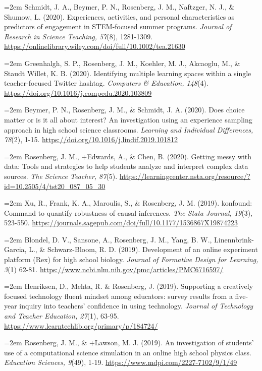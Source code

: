 \documentclass[
  14,
]{article}
\begin{document}
\hangindent=2em Schmidt, J. A., Beymer, P. N., Rosenberg, J. M.,
Naftzger, N. J., \& Shumow, L. (2020). Experiences, activities, and
personal characteristics as predictors of engagement in STEM-focused
summer programs. \emph{Journal of Research in Science Teaching, 57}(8),
1281-1309.
\url{https://onlinelibrary.wiley.com/doi/full/10.1002/tea.21630}

\hangindent=2em Greenhalgh, S. P., Rosenberg, J. M., Koehler, M. J.,
Akcaoglu, M., \& Staudt Willet, K. B. (2020). Identifying multiple
learning spaces within a single teacher-focused Twitter hashtag.
\emph{Computers \& Education, 148}(4).
\url{https://doi.org/10.1016/j.compedu.2020.103809}

\hangindent=2em Beymer, P. N., Rosenberg, J. M., \& Schmidt, J. A.
(2020). Does choice matter or is it all about interest? An investigation
using an experience sampling approach in high school science classrooms.
\emph{Learning and Individual Differences, 78}(2), 1-15.
\url{https://doi.org/10.1016/j.lindif.2019.101812}

\hangindent=2em Rosenberg, J. M., +Edwards, A., \& Chen, B. (2020).
Getting messy with data: Tools and strategies to help students analyze
and interpret complex data sources. \emph{The Science Teacher, 87}(5).
\url{https://learningcenter.nsta.org/resource/?id=10.2505/4/tst20_087_05_30}

\hangindent=2em Xu, R., Frank, K. A., Maroulis, S., \& Rosenberg, J. M.
(2019). konfound: Command to quantify robustness of causal inferences.
\emph{The Stata Journal, 19}(3), 523-550.
\url{https://journals.sagepub.com/doi/full/10.1177/1536867X19874223}

\hangindent=2em Blondel, D. V., Sansone, A., Rosenberg, J. M., Yang, B.
W., Linennbrink-Garcia, L., \& Schwarz-Bloom, R. D. (2019). Development
of an online experiment platform (Rex) for high school biology.
\emph{Journal of Formative Design for Learning, 3}(1) 62-81.
\url{https://www.ncbi.nlm.nih.gov/pmc/articles/PMC6716597/}

\hangindent=2em Henriksen, D., Mehta, R. \& Rosenberg, J. (2019).
Supporting a creatively focused technology fluent mindset among
educators: survey results from a five-year inquiry into teachers'
confidence in using technology. \emph{Journal of Technology and Teacher
Education, 27}(1), 63-95.
\url{https://www.learntechlib.org/primary/p/184724/}

\hangindent=2em Rosenberg, J. M., \& +Lawson, M. J. (2019). An
investigation of students' use of a computational science simulation in
an online high school physics class. \emph{Education Sciences, 9}(49),
1-19. \url{https://www.mdpi.com/2227-7102/9/1/49}
\end{document}
